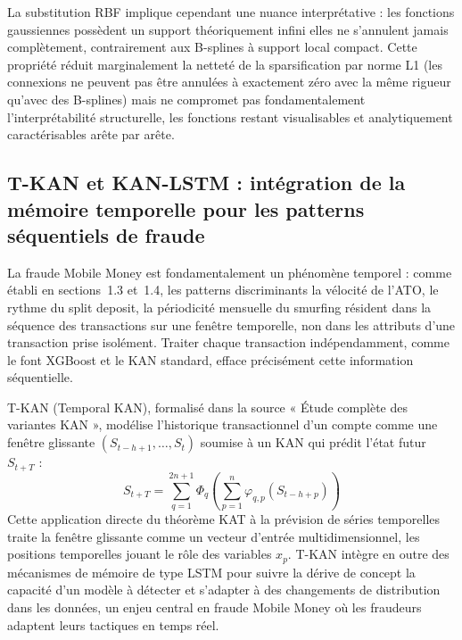 \documentclass[11pt,a4paper,oneside]{report}
\theoremstyle{definition}
\theoremstyle{remark}
\begin{document}
La substitution RBF implique cependant une nuance interprétative : les fonctions gaussiennes possèdent un support théoriquement infini  elles ne s'annulent jamais complètement, contrairement aux B-splines à support local compact. Cette propriété réduit marginalement la netteté de la sparsification par norme L1 (les connexions ne peuvent pas être annulées à exactement zéro avec la même rigueur qu'avec des B-splines) mais ne compromet pas fondamentalement l'interprétabilité structurelle, les fonctions restant visualisables et analytiquement caractérisables arête par arête.

\subsection{T-KAN et KAN-LSTM : intégration de la mémoire temporelle pour les patterns séquentiels de fraude}

La fraude Mobile Money est fondamentalement un phénomène temporel : comme établi en sections~1.3 et~1.4, les patterns discriminants  la vélocité de l'ATO, le rythme du split deposit, la périodicité mensuelle du smurfing  résident dans la séquence des transactions sur une fenêtre temporelle, non dans les attributs d'une transaction prise isolément. Traiter chaque transaction indépendamment, comme le font XGBoost et le KAN standard, efface précisément cette information séquentielle.

T-KAN (Temporal KAN), formalisé dans la source « Étude complète des variantes KAN », modélise l'historique transactionnel d'un compte comme une fenêtre glissante $(S_{t-h+1}, \ldots, S_t)$ soumise à un KAN qui prédit l'état futur $S_{t+T}$ :
\begin{equation}
S_{t+T} = \sum_{q=1}^{2n+1} \Phi_q\left(\sum_{p=1}^{n} \varphi_{q,p}(S_{t-h+p})\right)
\end{equation}
Cette application directe du théorème KAT à la prévision de séries temporelles traite la fenêtre glissante comme un vecteur d'entrée multidimensionnel, les positions temporelles jouant le rôle des variables $x_p$. T-KAN intègre en outre des mécanismes de mémoire de type LSTM pour suivre la dérive de concept  la capacité d'un modèle à détecter et s'adapter à des changements de distribution dans les données, un enjeu central en fraude Mobile Money où les fraudeurs adaptent leurs tactiques en temps réel.
\end{document}
